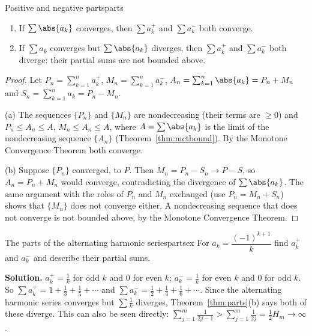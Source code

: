 \documentclass[11pt]{article}
\begin{document}
\begin{thm}{Positive and negative parts}{parts}
\begin{enumerate}[label=(\alph*)]
  \item If $\sum\abs{a_k}$ converges, then $\sum a_k^+$ and $\sum a_k^-$ both converge.
  \item If $\sum a_k$ converges but $\sum\abs{a_k}$ diverges, then $\sum a_k^+$ and $\sum a_k^-$ both diverge: their partial sums are not bounded above.
\end{enumerate}
\end{thm}
\begin{proof}
Let $P_n=\sum_{k=1}^na_k^+$, $M_n=\sum_{k=1}^na_k^-$, $A_n=\sum_{k=1}^n\abs{a_k}=P_n+M_n$ and $S_n=\sum_{k=1}^na_k=P_n-M_n$.

(a) The sequences $\{P_n\}$ and $\{M_n\}$ are nondecreasing (their terms are $\ge0$) and $P_n\le A_n\le A$, $M_n\le A_n\le A$, where $A=\sum\abs{a_k}$ is the limit of the nondecreasing sequence $\{A_n\}$ (Theorem~\ref{thm:mctbound}). By the Monotone Convergence Theorem both converge.

(b) Suppose $\{P_n\}$ converged, to $P$. Then $M_n=P_n-S_n\to P-S$, so $A_n=P_n+M_n$ would converge, contradicting the divergence of $\sum\abs{a_k}$. The same argument with the roles of $P_n$ and $M_n$ exchanged (use $P_n=M_n+S_n$) shows that $\{M_n\}$ does not converge either. A nondecreasing sequence that does not converge is not bounded above, by the Monotone Convergence Theorem.
\end{proof}

\begin{exmp}{The parts of the alternating harmonic series}{partsex}
For $a_k=\dfrac{(-1)^{k+1}}k$ find $a_k^+$ and $a_k^-$ and describe their partial sums.

\textbf{Solution.} $a_k^+=\frac1k$ for odd $k$ and $0$ for even $k$; $a_k^-=\frac1k$ for even $k$ and $0$ for odd $k$. So $\sum a_k^+=1+\frac13+\frac15+\cdots$ and $\sum a_k^-=\frac12+\frac14+\frac16+\cdots$. Since the alternating harmonic series converges but $\sum\frac1k$ diverges, Theorem~\ref{thm:parts}(b) says both of these diverge. This can also be seen directly: $\sum_{j=1}^m\frac1{2j-1}>\sum_{j=1}^m\frac1{2j}=\frac12H_m\to\infty$.
\end{exmp}
\end{document}
